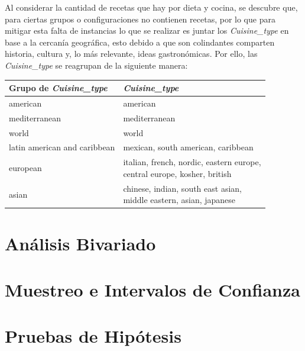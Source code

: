 \documentclass[12pt,a4paper]{article}
\begin{document}
{{            Al considerar la cantidad de recetas que hay por dieta y cocina, se 
            descubre que, para ciertas grupos o configuraciones no contienen recetas, 
            por lo que para mitigar esta falta de instancias lo que se realizar es juntar 
            los \emph{Cuisine\_type} en base a la cercanía geográfica, esto debido a 
            que son colindantes comparten historia, cultura y, lo más relevante, ideas 
            gastronómicas. Por ello, las \emph{Cuisine\_type} se reagrupan de la siguiente 
            manera: 

            \begin{center}
                \begin{tabular}{l|l}
                \toprule
                    Grupo de \emph{Cuisine\_type} & \emph{Cuisine\_type} \\
                \midrule
                    american & american \\
                    mediterranean & mediterranean \\
                    world & world \\
                    latin american and caribbean & mexican, south american, caribbean \\
                    european & \makecell{italian, french, nordic, eastern europe,\\central europe, kosher, british} \\
                    asian & \makecell{chinese, indian, south east asian,\\middle eastern, asian, japanese} \\
                \bottomrule
                \end{tabular}
            \end{center}

        }
    }

    \newpage

    \section{Análisis Bivariado}\label{sec:biva}
    {

    }

    \newpage

    \section{Muestreo e Intervalos de Confianza}
    {

    }

    \newpage

    \section{Pruebas de Hipótesis}
    {

    }
\end{document}
